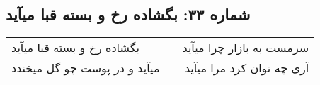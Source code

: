 \begin{center}
\section*{شماره ۳۳: بگشاده رخ و بسته قبا میآید}
\label{sec:033}
\begin{longtable}{l p{0.5cm} r}
بگشاده رخ و بسته قبا میآید
&&
سرمست به بازار چرا میآید
\\
میآید و در پوست چو گل میخندد
&&
آری چه توان کرد مرا میآید
\\
\end{longtable}
\end{center}
